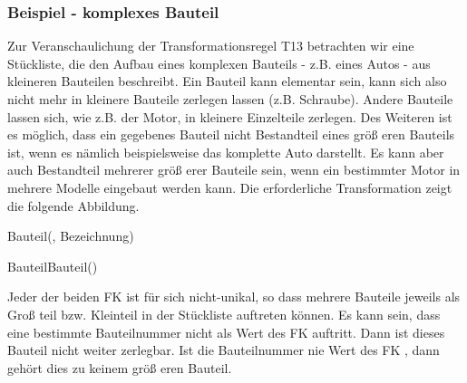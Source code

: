         \subsubsection{Beispiel - komplexes Bauteil}
          Zur Veranschaulichung der Transformationsregel T13 betrachten wir eine Stückliste, die den Aufbau eines komplexen Bauteils - z.B. eines Autos - aus kleineren Bauteilen beschreibt. Ein Bauteil kann elementar sein, kann sich also nicht mehr in kleinere Bauteile zerlegen lassen (z.B. Schraube). Andere Bauteile lassen sich, wie z.B. der Motor, in kleinere Einzelteile zerlegen. Des Weiteren ist es möglich, dass ein gegebenes Bauteil nicht Bestandteil eines größ eren Bauteils ist, wenn es nämlich beispielsweise das komplette Auto darstellt. Es kann aber auch Bestandteil mehrerer größ erer Bauteile sein, wenn ein bestimmter Motor in mehrere Modelle eingebaut werden kann. Die erforderliche Transformation zeigt die folgende Abbildung.
          \begin{center}
          \end{center}
          \begin{small}
            Bauteil(, Bezeichnung)

            BauteilBauteil()
          \end{small}

          Jeder der beiden FK ist für sich nicht-unikal, so dass mehrere Bauteile jeweils als Groß teil bzw. Kleinteil in der Stückliste auftreten können. Es kann sein, dass eine bestimmte Bauteilnummer nicht als Wert des FK  auftritt. Dann ist dieses Bauteil nicht weiter zerlegbar. Ist die Bauteilnummer nie Wert des FK , dann gehört dies zu keinem größ eren Bauteil.

